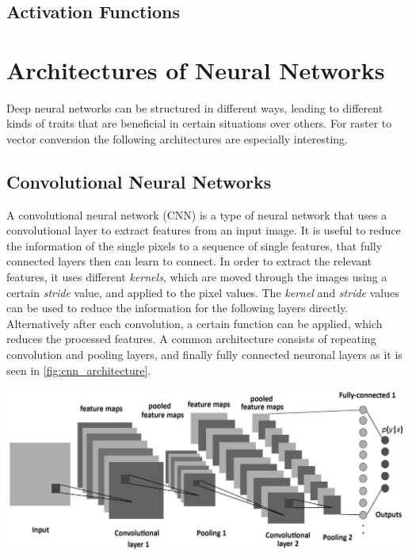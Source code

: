\documentclass[12pt, a4paper, titlepage]{report}
\begin{document}
\pagebreak

\section{}
\subsection{Activation Functions}

\section{Architectures of Neural Networks}

Deep neural networks can be structured in different ways, leading to different kinds of traits that are beneficial in certain situations over others. For raster to vector conversion the following architectures are especially interesting.

\subsection{Convolutional Neural Networks}

A convolutional neural network (CNN) is a type of neural network that uses a convolutional layer to extract features from an input image. It is useful to reduce the information of the single pixels to a sequence of single features, that fully connected layers then can learn to connect. In order to extract the relevant features, it uses different \emph{kernels}, which are moved through the images using a certain \emph{stride} value, and applied to the pixel values. The \emph{kernel} and \emph{stride} values can be used to reduce the information for the following layers directly. Alternatively after each convolution, a certain function can be applied, which reduces the processed features. A common architecture consists of repeating convolution and pooling layers, and finally fully connected neuronal layers as it is seen in \ref{fig:cnn_architecture}.

{
	\centering
	\includegraphics[width=1.0\textwidth]{../rc/images/cnn_architecture.png}
	\label{fig:cnn_architecture}
}
\end{document}
